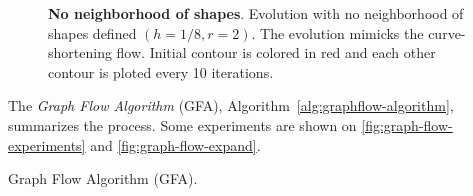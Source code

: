 \documentclass[review]{siamart220329}
\DeclareMathOperator*{\argmin}{arg\,min}
\begin{document}
\begin{figure}
	\caption{\textbf{No neighborhood of shapes}. Evolution with no neighborhood of shapes defined $(h=1/8,r=2)$. The evolution mimicks the curve-shortening flow. Initial contour is colored in red and each other contour is ploted every 10 iterations.}
	\label{fig:no-neighborhood-shapes-evolution}
\end{figure}
%
%
%
%
%
%
The {\em Graph Flow Algorithm} (GFA), Algorithm~\ref{alg:graphflow-algorithm}, summarizes the process. Some experiments are shown on \cref{fig:graph-flow-experiments} and \cref{fig:graph-flow-expand}.
%
%
\begin{algorithm}
 \caption{Graph Flow Algorithm (GFA).}
 \label{alg:graphflow-algorithm}  
\begin{algorithmic} 
 
	\STATE{$S^{(t+1)} \longleftarrow \displaystyle \argmin_{ S' \in \mathcal{C}^{(t)} }{ \hat{E}_{\vec{\theta}}(S')}$}		
  \ENDWHILE
\end{algorithmic}
\end{algorithm}
\end{document}

